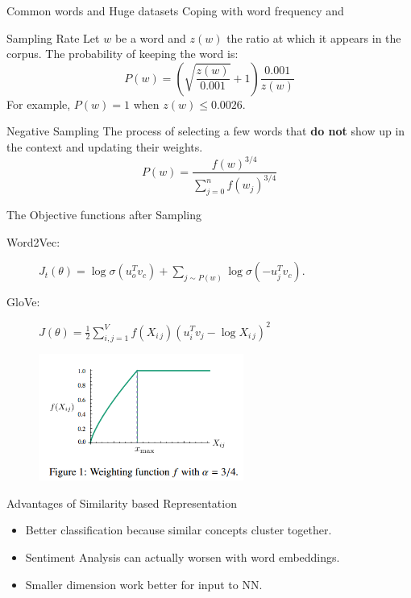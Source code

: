 \documentclass[9pt]{beamer}
\begin{document}
\begin{frame}{Common words and Huge datasets}
    Coping with word frequency and 
    \begin{block}{Sampling Rate}
        Let $w$ be a word and $z(w)$ the ratio at which it appears in the corpus. The probability of keeping the word is:
        $$P(w) = \left(\sqrt{\frac{z(w)}{0.001}} + 1\right) \frac{0.001}{z(w)}$$
For example, $P(w)=1$ when $z(w)\leq 0.0026$.
    \end{block}
    \begin{block}{Negative Sampling}
        The process of selecting a few words that \textbf{do not} show up in the context and updating their weights.
        $$P(w) = \frac{f(w)^{3/4}}{\sum_{j=0}^n f(w_j)^{3/4}}$$
    \end{block}
\end{frame}

\begin{frame}{The Objective functions after Sampling}
    \begin{description}
        \item[Word2Vec:] $\displaystyle J_t(\theta) = \log \sigma(u_o^T v_c) + \sum_{j\sim P(w)}\log \sigma(-u^T_j v_c)$.
        \item[GloVe:] $\displaystyle J(\theta) = \frac 12\sum_{i,j=1}^V f(X_{i\, j}) (u_i^T v_j - \log X_{i\, j})^2$
    \end{description}
    \begin{figure}[b]
    \includegraphics[width=0.6\textwidth]{glove-fig-1.png}
    \end{figure}
\end{frame}
\begin{frame}{Advantages of Similarity based Representation}

    \begin{itemize}
        \item Better classification because similar concepts cluster together.
        \item Sentiment Analysis can actually worsen with word embeddings.
        \item Smaller dimension work better for input to NN.
    \end{itemize}
\end{frame}
\end{document}
